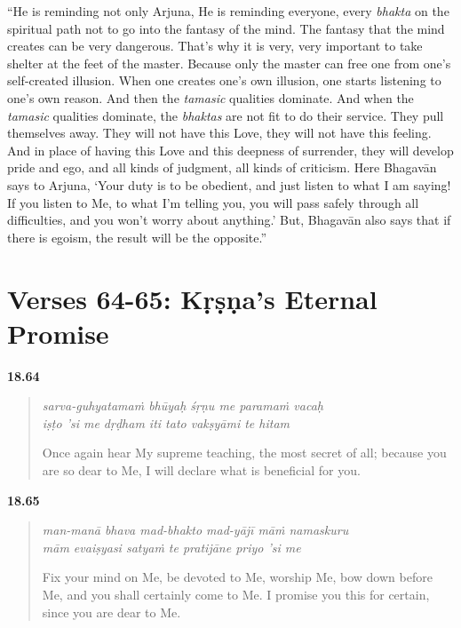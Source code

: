 \enquote{He is reminding not only Arjuna, He is reminding everyone, every \textit{bhakta} on the spiritual path not to go into the fantasy of the mind. The fantasy that the mind creates can be very dangerous. That’s why it is very, very important to take shelter at the feet of the master. Because only the master can free one from one’s self-created illusion. When one creates one’s own illusion, one starts listening to one’s own reason. And then the \textit{tamasic} qualities dominate. And when the \textit{tamasic} qualities dominate, the \textit{bhaktas} are not fit to do their service. They pull themselves away. They will not have this Love, they will not have this feeling. And in place of having this Love and this deepness of surrender, they will develop pride and ego, and all kinds of judgment, all kinds of criticism. Here Bhagavān says to Arjuna, \enquote{Your duty is to be obedient, and just listen to what I am saying! If you listen to Me, to what I’m telling you, you will pass safely through all difficulties, and you won’t worry about anything.} But, Bhagavān also says that if there is egoism, the result will be the opposite.}

\newpage

\section{Verses 64-65: Kṛṣṇa's Eternal Promise}\label{sec-verses-64-65-krsna-s-eternal-promise}


\par\noindent\textbf{18.64}\par
\begin{verse}
\textit{sarva-guhyatamaṁ bhūyaḥ śṛṇu me paramaṁ vacaḥ} \\
\textit{iṣṭo ’si me dṛḍham iti tato vakṣyāmi te hitam}

\noindent Once again hear My supreme teaching, the most secret of all; because you are so dear to Me, I will declare what is beneficial for you.
\end{verse}
\par



\par\noindent\textbf{18.65}\par
\begin{verse}
\textit{man-manā bhava mad-bhakto mad-yājī māṁ namaskuru} \\
\textit{mām evaiṣyasi satyaṁ te pratijāne priyo ’si me}

\noindent Fix your mind on Me, be devoted to Me, worship Me, bow down before Me, and you shall certainly come to Me. I promise you this for certain, since you are dear to Me.
\end{verse}
\par


